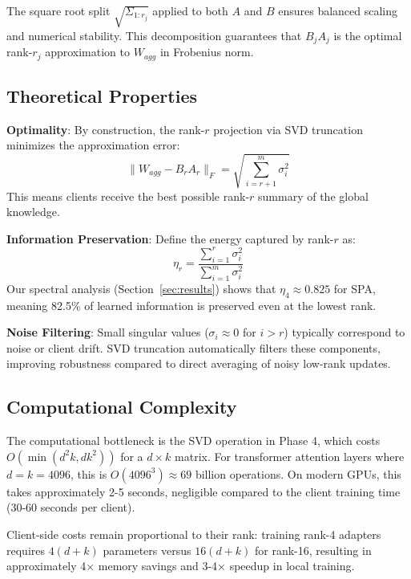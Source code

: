 \documentclass[conference]{IEEEtran}
\begin{document}
The square root split $\sqrt{\Sigma_{1:r_j}}$ applied to both $A$ and $B$ ensures balanced scaling and numerical stability. This decomposition guarantees that $B_j A_j$ is the optimal rank-$r_j$ approximation to $W_{agg}$ in Frobenius norm.

\subsection{Theoretical Properties}

\textbf{Optimality}: By construction, the rank-$r$ projection via SVD truncation minimizes the approximation error:
\begin{equation}
\|W_{agg} - B_r A_r\|_F = \sqrt{\sum_{i=r+1}^m \sigma_i^2}
\end{equation}
This means clients receive the best possible rank-$r$ summary of the global knowledge.

\textbf{Information Preservation}: Define the energy captured by rank-$r$ as:
\begin{equation}
\eta_r = \frac{\sum_{i=1}^r \sigma_i^2}{\sum_{i=1}^m \sigma_i^2}
\end{equation}
Our spectral analysis (Section~\ref{sec:results}) shows that $\eta_4 \approx 0.825$ for SPA, meaning 82.5\% of learned information is preserved even at the lowest rank.

\textbf{Noise Filtering}: Small singular values ($\sigma_i \approx 0$ for $i > r$) typically correspond to noise or client drift. SVD truncation automatically filters these components, improving robustness compared to direct averaging of noisy low-rank updates.

\subsection{Computational Complexity}

The computational bottleneck is the SVD operation in Phase 4, which costs $O(\min(d^2 k, d k^2))$ for a $d \times k$ matrix. For transformer attention layers where $d = k = 4096$, this is $O(4096^3) \approx 69$ billion operations. On modern GPUs, this takes approximately 2-5 seconds, negligible compared to the client training time (30-60 seconds per client).

Client-side costs remain proportional to their rank: training rank-4 adapters requires $4(d+k)$ parameters versus $16(d+k)$ for rank-16, resulting in approximately 4× memory savings and 3-4× speedup in local training.
\end{document}
